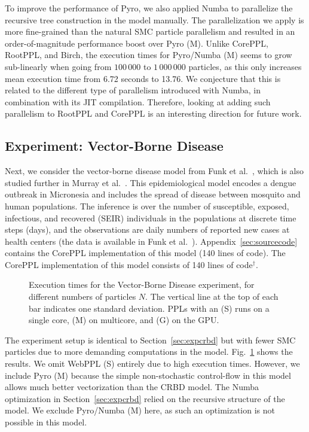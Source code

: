 \documentclass[runningheads]{llncs}
\begin{document}
To improve the performance of Pyro, we also applied Numba to parallelize the recursive tree construction in the model manually.
The parallelization we apply is more fine-grained than the natural SMC particle parallelism and resulted in an order-of-magnitude performance boost over Pyro (M).
Unlike CorePPL, RootPPL, and Birch, the execution times for Pyro/Numba (M) seems to grow sub-linearly when going from $100\,000$ to $1\,000\,000$ particles, as this only increases mean execution time from 6.72 seconds to 13.76.
We conjecture that this is related to the different type of parallelism introduced with Numba, in combination with its JIT compilation.
Therefore, looking at adding such parallelism to RootPPL and CorePPL is an interesting direction for future work.


\subsection{Experiment: Vector-Borne Disease}\label{sec:expssm}
Next, we consider the vector-borne disease model from Funk et al.~\cite{funk2016comparative}, which is also studied further in Murray et al.~\cite{murray2018delayed}.
This epidemiological model encodes a dengue outbreak in Micronesia and includes the spread of disease between mosquito and human populations.
The inference is over the number of susceptible, exposed, infectious, and recovered (SEIR) individuals in the populations at discrete time steps (days), and the observations are daily numbers of reported new cases at health centers (the data is available in Funk et al.~\cite{funk2016comparative}).
\ifextended
Appendix~\ref{sec:sourcecode} contains the CorePPL implementation of this model (140 lines of code).
\else
The CorePPL implementation of this model consists of 140 lines of code$^\dagger$.
\fi

\begin{figure}[tb]
  \resizebox{\textwidth}{!}{}
  \caption{Execution times for the Vector-Borne Disease experiment, for different numbers of particles $N$. The vertical line at the top of each bar indicates one standard deviation. PPLs with an (S) runs on a single core, (M) on multicore, and (G) on the GPU.}
  \label{fig:expssm}
\end{figure}
The experiment setup is identical to Section~\ref{sec:expcrbd} but with fewer SMC particles due to more demanding computations in the model.
Fig.~\ref{fig:expssm} shows the results.
We omit WebPPL (S) entirely due to high execution times.
However, we include Pyro (M) because the simple non-stochastic control-flow in this model allows much better vectorization than the CRBD model.
The Numba optimization in Section~\ref{sec:expcrbd} relied on the recursive structure of the model.
We exclude Pyro/Numba (M) here, as such an optimization is not possible in this model.
\end{document}
